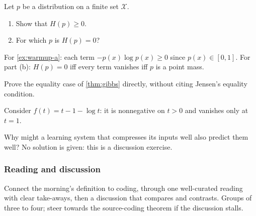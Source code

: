 \documentclass[11pt]{article}
\begin{document}
\begin{exercise}
\label{ex:warmup}
Let $p$ be a distribution on a finite set $\mathcal{X}$.
\begin{enumerate}
  \item Show that $H(p) \geq 0$.
        \label{ex:warmup-a}
  \item For which $p$ is $H(p) = 0$?
\end{enumerate}
\end{exercise}

\begin{solution}[ex:warmup]
For \cref{ex:warmup-a}: each term $-p(x)\log p(x) \geq 0$ since
$p(x) \in [0,1]$. For part (b): $H(p) = 0$ iff every term vanishes iff $p$ is
a point mass. 
\end{solution}

\begin{exercise}
\label{ex:gibbs-hard}
\important
Prove the equality case of \cref{thm:gibbs} directly, without citing Jensen's
equality condition. 
\end{exercise}

\begin{hint}
Consider $f(t) = t - 1 - \log t$: it is nonnegative on $t > 0$ and vanishes
only at $t = 1$.
\end{hint}

\begin{exercise}
\label{ex:open}
Why might a learning system that compresses its inputs well also predict
them well? No solution is given: this is a discussion exercise.
\end{exercise}

\subsubsection{Reading and discussion}
\label{sec:reading}

\begin{teachingnote}[Intent]
Connect the morning's definition to coding, through one well-curated
reading with clear take-aways, then a discussion that compares and
contrasts. Groups of three to four; steer towards the source-coding theorem
if the discussion stalls.
\end{teachingnote}
\end{document}
